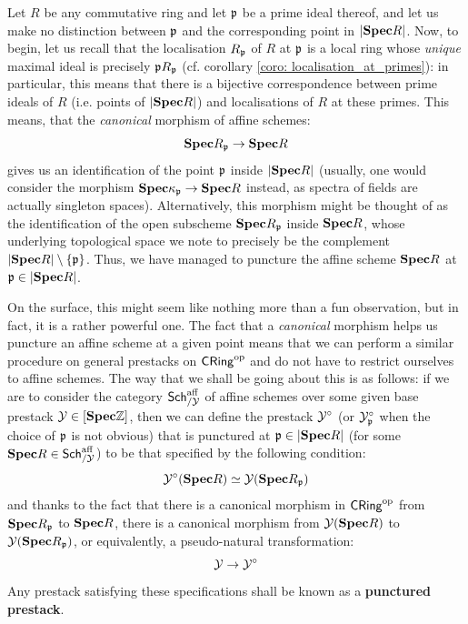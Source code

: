         \begin{example} \label{example: punctured_prestacks}
            Let $R$ be any commutative ring and let $\mathfrak{p}$ be a prime ideal thereof, and let us make no distinction between $\mathfrak{p}$ and the corresponding point in $|\mathbf{Spec} R|$. Now, to begin, let us recall that the localisation $R_{\mathfrak{p}}$ of $R$ at $\mathfrak{p}$ is a local ring whose \textit{unique} maximal ideal is precisely $\mathfrak{p} R_{\mathfrak{p}}$ (cf. corollary \ref{coro: localisation_at_primes}): in particular, this means that there is a bijective correspondence between prime ideals of $R$ (i.e. points of $|\mathbf{Spec} R|$) and localisations of $R$ at these primes. This means, that the \textit{canonical} morphism of affine schemes:
                $$\mathbf{Spec} R_{\mathfrak{p}} \to \mathbf{Spec} R$$
            gives us an identification of the point $\mathfrak{p}$ inside $|\mathbf{Spec} R|$ (usually, one would consider the morphism $\mathbf{Spec} \kappa_{\mathfrak{p}} \to \mathbf{Spec} R$ instead, as spectra of fields are actually singleton spaces). Alternatively, this morphism might be thought of as the identification of the open subscheme $\mathbf{Spec} R_{\mathfrak{p}}$ inside $\mathbf{Spec} R$, whose underlying topological space we note to precisely be the complement $|\mathbf{Spec} R| \setminus \{\mathfrak{p}\}$. Thus, we have managed to puncture the affine scheme $\mathbf{Spec} R$ at $\mathfrak{p} \in |\mathbf{Spec} R|$. 
            
            On the surface, this might seem like nothing more than a fun observation, but in fact, it is a rather powerful one. The fact that a \textit{canonical} morphism helps us puncture an affine scheme at a given point means that we can perform a similar procedure on general prestacks on $\mathsf{CRing}^{\mathrm{op}}$ and do not have to restrict ourselves to affine schemes. The way that we shall be going about this is as follows: if we are to consider the category $\mathsf{Sch}^{\mathrm{aff}}_{/\mathcal{Y}}$ of affine schemes over some given base prestack $\mathcal{Y} \in [\mathbf{Spec} \mathbb{Z}]$, then we can define the prestack $\mathcal{Y}^{\circ}$ (or $\mathcal{Y}^{\circ}_{\mathfrak{p}}$ when the choice of $\mathfrak{p}$ is not obvious) that is punctured at $\mathfrak{p} \in |\mathbf{Spec} R|$ (for some $\mathbf{Spec} R \in \mathsf{Sch}^{\mathrm{aff}}_{/\mathcal{Y}}$) to be that specified by the following condition:
                $$\mathcal{Y}^{\circ}(\mathbf{Spec} R) \simeq \mathcal{Y}(\mathbf{Spec} R_{\mathfrak{p}})$$
            and thanks to the fact that there is a canonical morphism in $\mathsf{CRing}^{\mathrm{op}}$ from $\mathbf{Spec} R_{\mathfrak{p}}$ to $\mathbf{Spec} R$, there is a canonical morphism from $\mathcal{Y}(\mathbf{Spec} R)$ to $\mathcal{Y}(\mathbf{Spec} R_{\mathfrak{p}})$, or equivalently, a pseudo-natural transformation:
                $$\mathcal{Y} \to \mathcal{Y}^{\circ}$$
            Any prestack satisfying these specifications shall be known as a \textbf{punctured prestack}. 
            

\end{example}
